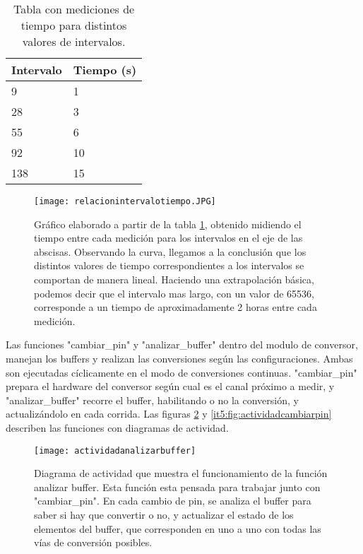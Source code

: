 \begin{table}[h]
\centering
\caption{Tabla con mediciones de tiempo para distintos valores de intervalos.}
\label{it5:tab:tablamediciones}
\begin{tabular}{|l|l|}
\hline
\rowcolor[HTML]{34CDF9} 
Intervalo & Tiempo (s) \\ \hline
\rowcolor[HTML]{CBF3FF} 
9         & 1          \\ \hline
\rowcolor[HTML]{CBF3FF} 
28        & 3          \\ \hline
\rowcolor[HTML]{CBF3FF} 
55        & 6          \\ \hline
\rowcolor[HTML]{CBF3FF} 
92        & 10         \\ \hline
\rowcolor[HTML]{CBF3FF} 
138       & 15         \\ \hline
\end{tabular}
\end{table}

\begin{figure}[h]
  \centering
  \texttt{[image: relacionintervalotiempo.JPG]}
  \caption{Gráfico elaborado a partir de la tabla \ref{it5:tab:tablamediciones}, obtenido midiendo el tiempo entre cada medición para los intervalos en el eje de las abscisas. Observando la curva, llegamos a la conclusión que los distintos valores de tiempo correspondientes a los intervalos se comportan de manera lineal. Haciendo una extrapolación básica, podemos decir que el intervalo mas largo, con un valor de 65536, corresponde a un tiempo de aproximadamente 2 horas entre cada medición.}\label{it5:fig:relacionintervalotiempo}
\end{figure}

Las funciones "cambiar\_pin" y "analizar\_buffer" dentro del modulo de conversor, manejan los buffers y realizan las conversiones según las configuraciones. Ambas son ejecutadas cíclicamente en el modo de conversiones continuas. "cambiar\_pin" prepara el hardware del conversor según cual es el canal próximo a medir, y "analizar\_buffer" recorre el buffer, habilitando o no la conversión, y actualizándolo en cada corrida. Las figuras \ref{it5:fig:actividadanalizarbuffer} y \ref{it5:fig:actividadcambiarpin} describen las funciones con diagramas de actividad.
 
\begin{figure}[h]
  \centering
  \texttt{[image: actividadanalizarbuffer]}
  \caption[Diagrama de actividad de la función analizar buffer]{Diagrama de actividad que muestra el funcionamiento de la función analizar buffer. Esta función esta pensada para trabajar junto con "cambiar\_pin". En cada cambio de pin, se analiza el buffer para saber si hay que convertir o no, y actualizar el estado de los elementos del buffer, que corresponden en uno a uno con todas las vías de conversión posibles.}\label{it5:fig:actividadanalizarbuffer}
\end{figure}



